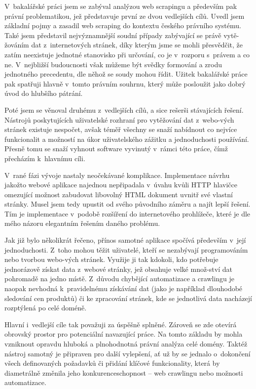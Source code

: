 \documentclass[thesis=B,czech]{FITthesis}[2012/06/26]
\begin{document}
\begin{conclusion}
	V~bakalářské práci jsem se zabýval analýzou web scrapingu a především pak právní problematikou, jež představuje první ze dvou vedlejších cílů. Uvedl jsem základní pojmy a zasadil web scraping do kontextu českého právního systému. Také jsem představil nejvýznamnější soudní případy zabývající se právě vytě-žováním dat z~internetových stránek, díky kterým jsme se mohli přesvědčit, že zatím neexistuje jednotné stanovisko při určování, co je v~rozporu s~právem a co ne. V~nejbližší budoucnosti však můžeme být svědky formování a zrodu jednotného precedentu, dle něhož se soudy mohou řídit. Užitek bakalářské práce pak spatřuji hlavně v~tomto právním souhrnu, který může posloužit jako dobrý úvod do hlubšího pátrání.
	
	Poté jsem se věnoval druhému z~vedlejších cílů, a sice rešerši stávajících řešení. Nástrojů poskytujících uživatelské rozhraní pro vytěžování dat z~webo-vých stránek existuje nespočet, avšak téměř všechny se snaží nabídnout co nejvíce funkcionalit a možností na úkor uživatelského zážitku a jednoduchosti používání. Přesně tomu se snaží vyhnout software vyvinutý v~rámci této práce, čímž přecházím k~hlavnímu cíli.
	
	V~rané fázi vývoje nastaly neočekávané komplikace. Implementace návrhu jakožto webové aplikace najednou nepřipadala v~úvahu kvůli HTTP hlavičce omezující možnost zabudovat libovolný HTML dokument uvnitř své vlastní stránky. Musel jsem tedy upustit od svého původního záměru a najít lepší řešení. Tím je implementace v~podobě rozšíření do internetového prohlížeče, které je dle mého názoru elegantním řešením daného problému.
	
	Jak již bylo několikrát řečeno, přínos samotné aplikace spočívá především v~její jednoduchosti. Z~toho mohou těžit uživatelé, kteří se nezabývají programováním nebo tvorbou webo-vých stránek. Využije ji tak kdokoli, kdo potřebuje jednorázově získat data z~webové stránky, jež obsahuje velké množ-ství dat pohromadě na jedno místě. Z~důvodu chybějící automatizace a crawlingu je naopak nevhodná k~pravidelnému získávání dat (jako je například dlouhodobé sledování cen produktů) či ke zpracování stránek, kde se jednotlivá data nacházejí rozptýlená po celé doméně.
	
	Hlavní i~vedlejší cíle tak považuji za úspěšně splněné. Zároveň se zde otevírá obrovský prostor pro potenciální navazující práce. Na tomto základu by mohla vzniknout opravdu hluboká a plnohodnotná právní analýza celé domény. Taktéž nástroj samotný je připraven pro další vylepšení, ať už by se jednalo o~dokončení všech definovaných požadavků či přidání klíčové funkcionality, která by diametrálně změnila jeho konkurenceschopnost -- web crawlingu nebo možnosti automatizace.
\end{conclusion}
\end{document}

